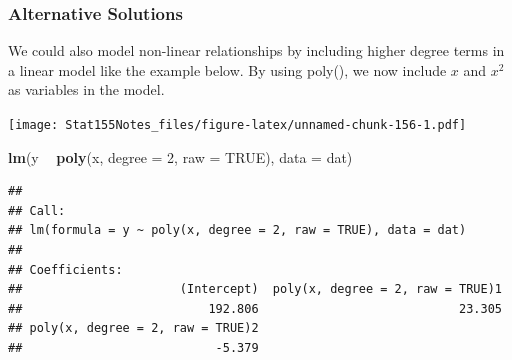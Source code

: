 \documentclass[]{book}
\newenvironment{Shaded}{\begin{snugshade}}{\end{snugshade}}
\newcommand{\DataTypeTok}[1]{\textcolor[rgb]{0.13,0.29,0.53}{#1}}
\newcommand{\DecValTok}[1]{\textcolor[rgb]{0.00,0.00,0.81}{#1}}
\newcommand{\KeywordTok}[1]{\textcolor[rgb]{0.13,0.29,0.53}{\textbf{#1}}}
\newcommand{\NormalTok}[1]{#1}
\newcommand{\OperatorTok}[1]{\textcolor[rgb]{0.81,0.36,0.00}{\textbf{#1}}}
\newcommand{\OtherTok}[1]{\textcolor[rgb]{0.56,0.35,0.01}{#1}}
\newcommand{\StringTok}[1]{\textcolor[rgb]{0.31,0.60,0.02}{#1}}
\begin{document}
\hypertarget{alternative-solutions}{%
\subsubsection{Alternative Solutions}\label{alternative-solutions}}

We could also model non-linear relationships by including higher degree terms in a linear model like the example below. By using poly(), we now include \(x\) and \(x^2\) as variables in the model.

\begin{Shaded}
\end{Shaded}

\texttt{[image: Stat155Notes\_files/figure-latex/unnamed-chunk-156-1.pdf]}

\begin{Shaded}
\begin{Highlighting}[]
\KeywordTok{lm}\NormalTok{(y }\OperatorTok{~}\StringTok{ }\KeywordTok{poly}\NormalTok{(x, }\DataTypeTok{degree =} \DecValTok{2}\NormalTok{, }\DataTypeTok{raw =} \OtherTok{TRUE}\NormalTok{), }\DataTypeTok{data =}\NormalTok{ dat)}
\end{Highlighting}
\end{Shaded}

\begin{verbatim}
## 
## Call:
## lm(formula = y ~ poly(x, degree = 2, raw = TRUE), data = dat)
## 
## Coefficients:
##                      (Intercept)  poly(x, degree = 2, raw = TRUE)1  
##                          192.806                            23.305  
## poly(x, degree = 2, raw = TRUE)2  
##                           -5.379
\end{verbatim}
\end{document}
